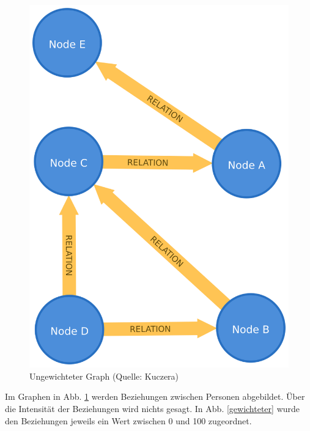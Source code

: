 \documentclass[ngerman,]{scrreprt}
\begin{document}
\begin{figure}
\centering
\includegraphics{Bilder/unWeightedGraph.png}
\caption{Ungewichteter Graph (Quelle: Kuczera)} 
\label{ungewichteter}
\end{figure}

Im Graphen in Abb. \ref{ungewichteter} werden Beziehungen zwischen Personen abgebildet. Über die Intensität der Beziehungen wird nichts gesagt. In  Abb. \ref{gewichteter} wurde den Beziehungen jeweils ein Wert zwischen 0 und 100 zugeordnet.
\end{document}
